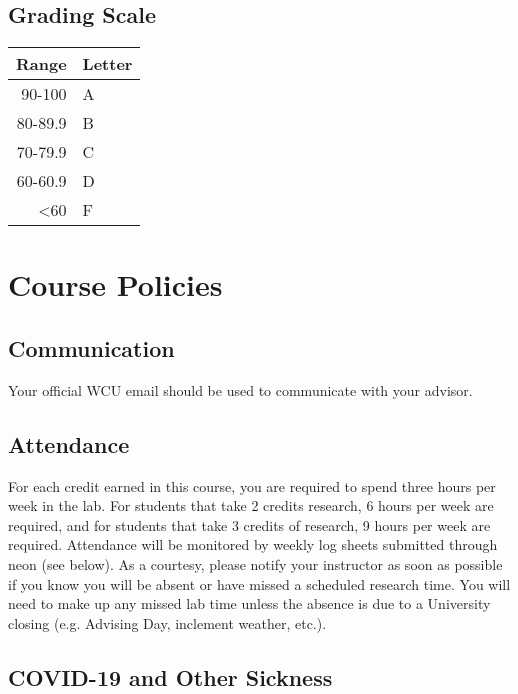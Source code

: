 \documentclass[11pt]{article}
\begin{document}
\subsection{Grading Scale}
\label{sec:org348d95e}

\begin{center}
\begin{tabular}{rl}
Range & Letter\\
\hline
90-100 & A\\
80-89.9 & B\\
70-79.9 & C\\
60-60.9 & D\\
<60 & F\\
\end{tabular}
\end{center}

\section{Course Policies}
\label{sec:org1f02e2f}

\subsection{Communication}
\label{sec:org4dba43a}

Your official WCU email should be used to communicate with your advisor.  

\subsection{Attendance}
\label{sec:orgebd30e9}

For each credit earned in this course, you are required to spend three hours per week in the lab. For students that take 2 credits research, 6 hours per week are required, and for students that take 3 credits of research, 9 hours per week are required. Attendance will be monitored by weekly log sheets submitted through neon (see below). As a courtesy, please notify your instructor as soon as possible if you know you will be absent or have missed a scheduled research time. You will need to make up any missed lab time unless the absence is due to a University closing (e.g. Advising Day, inclement weather, etc.).

\subsection{COVID-19 and Other Sickness}
\label{sec:org00a9217}
\end{document}
